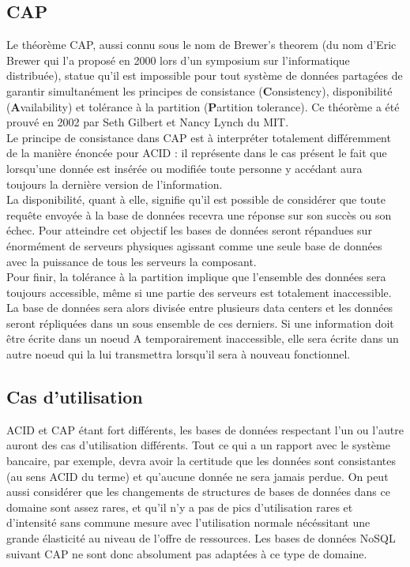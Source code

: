 \documentclass[11pt]{article}
\begin{document}
\subsection{CAP}
Le théorème CAP, aussi connu sous le nom de Brewer's theorem (du nom d'Eric Brewer qui l'a proposé en 2000 lors d'un symposium sur l'informatique distribuée), statue qu'il est impossible pour tout système de données partagées de garantir simultanément les principes de consistance (\textbf{C}onsistency), disponibilité (\textbf{A}vailability) et tolérance à la partition (\textbf{P}artition tolerance). Ce théorème a été prouvé en 2002 par Seth Gilbert et Nancy Lynch du MIT\cite{cap}. \\
Le principe de consistance dans CAP est à interpréter totalement différemment de la manière énoncée pour ACID : il représente dans le cas présent le fait que lorsqu'une donnée est insérée ou modifiée toute personne y accédant aura toujours la dernière version de l'information. \\
La disponibilité, quant à elle, signifie qu'il est possible de considérer que toute requête envoyée à la base de données recevra une réponse sur son succès ou son échec. Pour atteindre cet objectif les bases de données seront répandues sur énormément de serveurs physiques agissant comme une seule base de données avec la puissance de tous les serveurs la composant. \\
Pour finir, la tolérance à la partition implique que l'ensemble des données sera toujours accessible, même si une partie des serveurs est totalement inaccessible. La base de données sera alors divisée entre plusieurs data centers et les données seront répliquées dans un sous ensemble de ces derniers. Si une information doit être écrite dans un noeud A temporairement inaccessible, elle sera écrite dans un autre noeud qui la lui transmettra lorsqu'il sera à nouveau fonctionnel. 
\subsection{Cas d'utilisation}
ACID et CAP étant fort différents, les bases de données respectant l'un ou l'autre auront des cas d'utilisation différents. Tout ce qui a un rapport avec le système bancaire, par exemple, devra avoir la certitude que les données sont consistantes (au sens ACID du terme) et qu'aucune donnée ne sera jamais perdue. On peut aussi considérer que les changements de structures de bases de données dans ce domaine sont assez rares, et qu'il n'y a pas de pics d'utilisation rares et d'intensité sans commune mesure avec l'utilisation normale nécéssitant une grande élasticité au niveau de l'offre de ressources. Les bases de données NoSQL suivant CAP ne sont donc absolument pas adaptées à ce type de domaine. %
\end{document}
